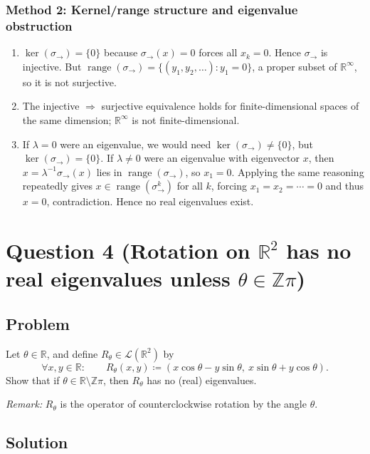 \documentclass[12pt]{article}
\newcommand{\R}{\mathbb{R}}
\newcommand{\cL}{\mathcal{L}}
\newcommand{\Range}{\operatorname{range}}
\begin{document}
\subsubsection{Method 2: Kernel/range structure and eigenvalue obstruction}
\begin{enumerate}[label=(\alph*)]
\item $\ker(\sigma_{\rightarrow})=\{0\}$ because $\sigma_{\rightarrow}(x)=0$ forces all $x_k=0$.
Hence $\sigma_{\rightarrow}$ is injective. But $\Range(\sigma_{\rightarrow})=\{(y_1,y_2,\dots):y_1=0\}$, a proper subset of $\R^\infty$,
so it is not surjective.

\item The injective $\Rightarrow$ surjective equivalence holds for finite-dimensional spaces of the same dimension; $\R^\infty$ is not finite-dimensional.

\item If $\lambda=0$ were an eigenvalue, we would need $\ker(\sigma_{\rightarrow})\neq\{0\}$, but $\ker(\sigma_{\rightarrow})=\{0\}$.
If $\lambda\neq 0$ were an eigenvalue with eigenvector $x$, then $x=\lambda^{-1}\sigma_{\rightarrow}(x)$ lies in $\Range(\sigma_{\rightarrow})$,
so $x_1=0$. Applying the same reasoning repeatedly gives $x\in\Range(\sigma_{\rightarrow}^k)$ for all $k$,
forcing $x_1=x_2=\cdots=0$ and thus $x=0$, contradiction. Hence no real eigenvalues exist.
\end{enumerate}

\newpage
\section{Question 4 (Rotation on $\R^2$ has no real eigenvalues unless $\theta\in\mathbb{Z}\pi$)}
\subsection{Problem}
Let $\theta\in\R$, and define $R_{\theta}\in \cL(\R^2)$ by
\[
\forall x,y\in\R:\qquad
R_{\theta}(x,y)\coloneqq (x\cos\theta - y\sin\theta,\ x\sin\theta + y\cos\theta).
\]
Show that if $\theta\in \R\setminus \mathbb{Z}\pi$, then $R_{\theta}$ has no (real) eigenvalues.

\medskip
\noindent\textit{Remark:} $R_{\theta}$ is the operator of counterclockwise rotation by the angle $\theta$.

\subsection{Solution}
\end{document}
